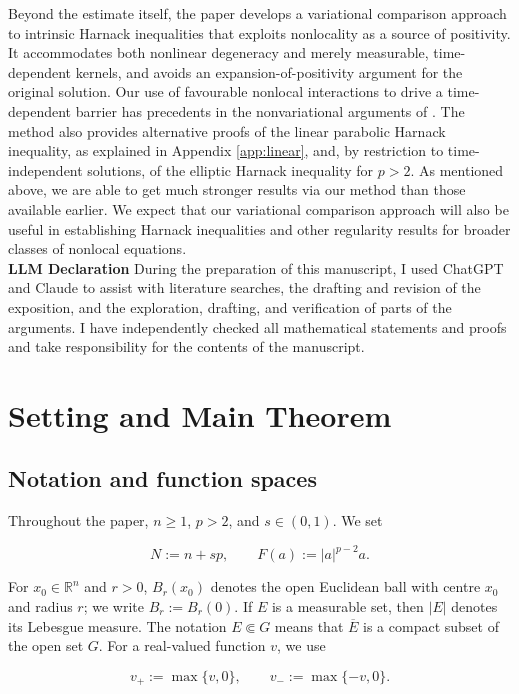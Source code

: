 \documentclass[10pt]{amsart}
\theoremstyle{plain}
\theoremstyle{definition}
\theoremstyle{remark}
\numberwithin{equation}{section}
\newcommand{\R}{\mathbb R}
\begin{document}
Beyond the estimate itself, the paper develops a variational
comparison approach to intrinsic Harnack inequalities that exploits
nonlocality as a source of positivity. It accommodates both nonlinear
degeneracy and merely measurable, time-dependent kernels, and avoids
an expansion-of-positivity argument for the original solution.
Our use of favourable nonlocal interactions to drive a time-dependent
barrier has precedents in the nonvariational arguments of
\cite{SilvestreDCDS,SilvestreAdvection}.
The method also provides alternative proofs of the linear parabolic
Harnack inequality, as explained in Appendix \ref{app:linear}, and,
by restriction to time-independent solutions, of the elliptic Harnack
inequality for $p>2$. As mentioned above, we are able to get
much stronger results via our method than those available earlier. 
We expect that our variational comparison approach will also be useful in establishing Harnack inequalities 
and other regularity results for broader classes of nonlocal equations. 
\\

\noindent\textbf{LLM Declaration}
During the preparation of this manuscript, I used ChatGPT and Claude
to assist with literature searches, the drafting and revision of the
exposition, and the exploration, drafting, and verification of parts of
the arguments. I have independently checked all mathematical statements
and proofs and take responsibility for the contents of the manuscript.

\section{Setting and Main Theorem}

\subsection{Notation and function spaces}

Throughout the paper, $n\ge1$, $p>2$, and $s\in(0,1)$. We set

\[
    N:=n+sp,
    \qquad
    F(a):=|a|^{p-2}a.
\]

For $x_0\in\R^n$ and $r>0$, $B_r(x_0)$ denotes the open Euclidean ball
with centre $x_0$ and radius $r$; we write $B_r:=B_r(0)$. If $E$ is a
measurable set, then $|E|$ denotes its Lebesgue measure. The notation
$E\Subset G$ means that $\overline E$ is a compact subset of the open set
$G$. For a real-valued function $v$, we use

\[
    v_+:=\max\{v,0\},
    \qquad
    v_-:=\max\{-v,0\}.
\]
\end{document}
